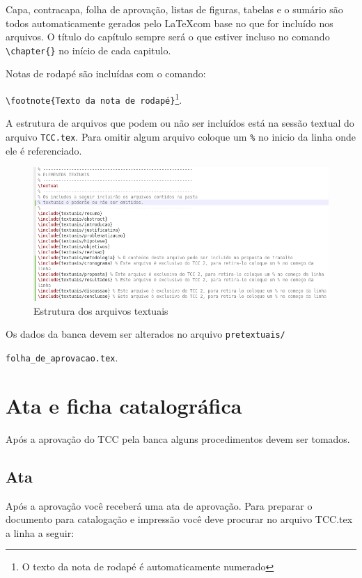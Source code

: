 Capa, contracapa, folha de aprovação, listas de figuras, tabelas e o sumário são todos automaticamente gerados pelo \LaTeX   com base no que for incluído nos arquivos. O título do capítulo sempre será o que estiver incluso no comando \verb|\chapter{}| no início de cada capitulo. 

Notas de rodapé são incluídas com o comando:\par
\verb|\footnote{Texto da nota de rodapé}|\footnote{O texto da nota de rodapé é automaticamente numerado}.

A estrutura de arquivos que podem ou não ser incluídos está na sessão textual do arquivo \verb|TCC.tex|. Para omitir algum arquivo coloque um \verb|%| no inicio da linha onde ele é referenciado. 

\begin{figure}[!htb]
	\centering 
	\includegraphics[width=\textwidth]{imagens/estrutura}
	\caption{Estrutura dos arquivos textuais}
	\label{fig:estrutura}
\end{figure}

Os dados da banca devem ser alterados no arquivo \verb|pretextuais/|\par\verb|folha_de_aprovacao.tex|.

\section{Ata e ficha catalográfica}

Após a aprovação do TCC pela banca alguns procedimentos devem ser tomados. 

\subsection{Ata}
Após a aprovação você receberá uma ata de aprovação. Para preparar o documento para catalogação e impressão você deve procurar no arquivo TCC.tex a linha a seguir: 
\par\verb|| \par

